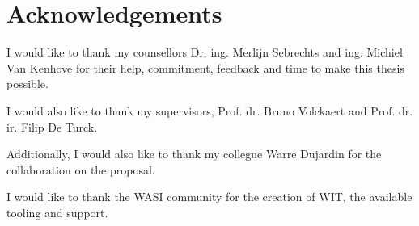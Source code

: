 \chapter*{Acknowledgements}
I would like to thank my counsellors Dr. ing. Merlijn Sebrechts and ing. Michiel Van Kenhove for their help, commitment, feedback and time to make this thesis possible.

I would also like to thank my supervisors, Prof. dr. Bruno Volckaert and Prof. dr. ir. Filip De Turck.

Additionally, I would also like to thank my collegue Warre Dujardin for the collaboration on the proposal.

I would like to thank the WASI community for the creation of WIT, the available tooling and support.